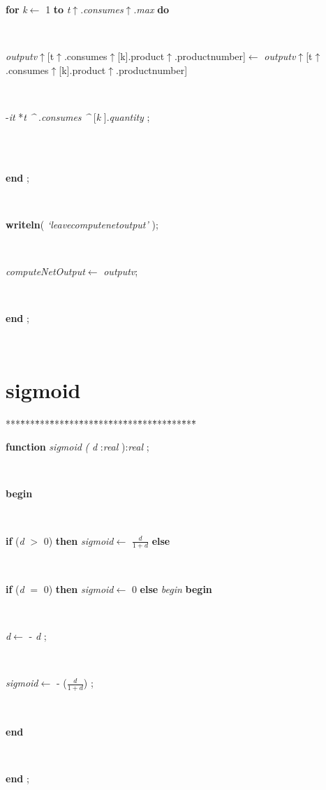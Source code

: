 \begin{tabbing}
\+\parbox{14cm}{\textsf {\textbf {for } \textsf{\textit{k}$\leftarrow$ 1} \textbf{ to } \textsf{\textit{t}$\uparrow$.\textit{consumes}$\uparrow$.\textit{max}} \textbf{ do } }}\\
\parbox{14cm}{\textsf{\textit{outputv}$\uparrow$\textit{}[t$\uparrow$.consumes$\uparrow$[k].product$\uparrow$.productnumber]$\leftarrow$ \textit{outputv}$\uparrow$\textit{}[t$\uparrow$.consumes$\uparrow$[k].product$\uparrow$.productnumber]}}\\
\-\parbox{14cm}{\textsf{-\textit{it} *\textit{t} \textit{\^{}} .\textit{consumes} \textit{\^{}} [\textit{k} ].\textit{quantity} ;}}\\
\\
\<\-\parbox{14cm}{\textsf{\textbf{end} ;}}\\
\parbox{14cm}{\textsf{\textbf{writeln}(\textit{\textrm{\textup { `leavecomputenetoutput' } }})}; }\\
\parbox{14cm}{\textsf{\textit{computeNetOutput}$\leftarrow$ \textit{outputv}}; }\\
\<\-\parbox{14cm}{\textsf{\textbf{end} ;}}\\
\end{tabbing}
\section{sigmoid}\label{sec:harmonysigmoid}

\begin{tabbing}
***\=***\=***\=***\=***\=***\=***\=***\=***\=***\=***\=***\=***\=\kill
\parbox{14cm}{\textsf{\textbf{function}  \textit{sigmoid} \textit{(}   \textit{d} :\textit{real} ):\textit{real} ;}}\\
\+\parbox{14cm}{\textsf{\textbf{begin} }}\\
\+\+\parbox{14cm}{\textsf {\textbf {if } \textsf{(\textit{d} $>$ 0)} \textbf{ then } \textsf{\textit{sigmoid}$\leftarrow$ $\frac{\textit{d}}{1 + \textit{d}}$} \textbf{ else } }}\\
\+\<\parbox{14cm}{\textsf {\textbf {if } \textsf{(\textit{d} $=$ 0)} \textbf{ then } \textsf{\textit{sigmoid}$\leftarrow$ 0} \textbf{ else } \textsf{\textit{begin}} \textbf{ begin } }}\\
\parbox{14cm}{\textsf{\textit{d}$\leftarrow$  -  \textit{d} }; }\\
\parbox{14cm}{\textsf{\textit{sigmoid}$\leftarrow$  -  ($\frac{\textit{d}}{1 + \textit{d}}$) }; }\\
\<\-\parbox{14cm}{\textsf{\textbf{end} }}\\
\<\-\<\-\<\-\parbox{14cm}{\textsf{\textbf{end} ;}}\\
\end{tabbing}
